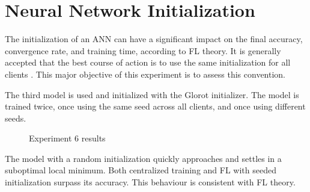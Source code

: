 \section{Neural Network Initialization}
The initialization of an ANN can have a significant impact on the final accuracy, convergence rate, and training time, according to FL theory. It is generally accepted that the best course of action is to use the same initialization for all clients \cite{FL-original-paper}.  This major objective of this experiment is to assess this convention. %
\begin{table}[H]
    \center
    \caption[Experiment 6 parameters]{Experiment 6 parameters}
    \label{table:Experiment 6 parameters}
\end{table}
The third model is used and initialized with the Glorot initializer. The model is trained twice, once using the same seed across all clients, and once using different seeds.
\begin{figure}[H]
    \center
    
    \caption[Experiment 6 results]{Experiment 6 results}
    \label{fig:Experiment 6 results}
\end{figure}
The model with a random initialization quickly approaches and settles in a suboptimal local minimum. Both centralized training and FL with seeded initialization surpass its accuracy. This behaviour is consistent with FL theory.

